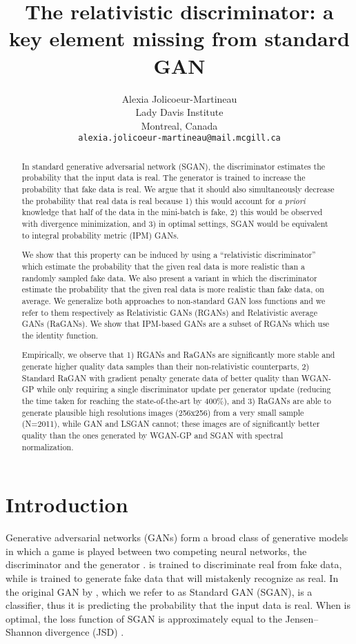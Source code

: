 \documentclass{article}
\title{The relativistic discriminator: a key element missing from standard GAN}
\author{
  Alexia Jolicoeur-Martineau \\
  Lady Davis Institute\\
  Montreal, Canada\\
  \texttt{alexia.jolicoeur-martineau@mail.mcgill.ca} \\
}
\begin{document}
\maketitle

\begin{abstract}
	
	In standard generative adversarial network (SGAN), the discriminator  estimates the probability that the input data is real. The generator  is trained to increase the probability that fake data is real. We argue that it should also simultaneously decrease the probability that real data is real because 1) this would account for \textit{a priori} knowledge that half of the data in the mini-batch is fake, 2) this would be observed with divergence minimization, and 3) in optimal settings, SGAN would be equivalent to integral probability metric (IPM) GANs. 

	We show that this property can be induced by using a “relativistic discriminator” which estimate the probability that the given real data is more realistic than a randomly sampled fake data. We also present a variant in which the discriminator estimate the probability that the given real data is more realistic than fake data, on average. We generalize both approaches to non-standard GAN loss functions and we refer to them respectively as Relativistic GANs (RGANs) and Relativistic average GANs (RaGANs). We show that IPM-based GANs are a subset of RGANs which use the identity function.
	
	Empirically, we observe that 1) RGANs and RaGANs are significantly more stable and generate higher quality data samples than their non-relativistic counterparts, 2) Standard RaGAN with gradient penalty generate data of better quality than WGAN-GP while only requiring a single discriminator update per generator update (reducing the time taken for reaching the state-of-the-art by 400\%), and 3) RaGANs are able to generate plausible high resolutions images (256x256) from a very small sample (N=2011), while GAN and LSGAN cannot; these images are of significantly better quality than the ones generated by WGAN-GP and SGAN with spectral normalization. 

\end{abstract}

\section{Introduction}

Generative adversarial networks (GANs) \citep{hong2017generative} form a broad class of generative models in which a game is played between two competing neural networks, the discriminator  and the generator .  is trained to discriminate real from fake data, while  is trained to generate fake data that  will mistakenly recognize as real. In the original GAN by \citet{GAN}, which we refer to as Standard GAN (SGAN),  is a classifier, thus it is predicting the probability that the input data is real. When  is optimal, the loss function of SGAN is approximately equal to the Jensen–Shannon divergence (JSD) \citep{GAN}. 
\end{document}
